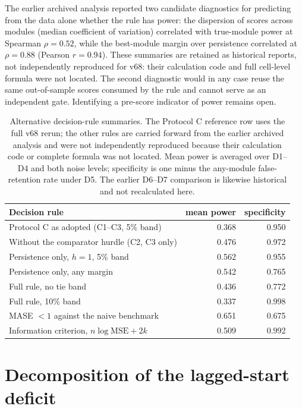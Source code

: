 The earlier archived analysis reported two candidate diagnostics for predicting from the data alone whether the rule has power: the dispersion of scores across modules (median coefficient of variation) correlated with true-module power at Spearman $\rho=0.52$, while the best-module margin over persistence correlated at $\rho=0.88$ (Pearson $r=0.94$). These summaries are retained as historical reports, not independently reproduced for v68: their calculation code and full cell-level formula were not located. The second diagnostic would in any case reuse the same out-of-sample scores consumed by the rule and cannot serve as an independent gate. Identifying a pre-score indicator of power remains open.

\FloatBarrier

\begin{table}[!htb]
\centering\small
\caption{Alternative decision-rule summaries. The Protocol C reference row uses the full v68 rerun; the other rules are carried forward from the earlier archived analysis and were not independently reproduced because their calculation code or complete formula was not located. Mean power is averaged over D1--D4 and both noise levels; specificity is one minus the any-module false-retention rate under D5. The earlier D6--D7 comparison is likewise historical and not recalculated here.}
\label{tab:si_rules}
\begin{tabular}{@{}lrr@{}}
\toprule
Decision rule & mean power & specificity \\
\midrule
Protocol C as adopted (C1--C3, 5\% band) & 0.368 & 0.950 \\
Without the comparator hurdle (C2, C3 only) & 0.476 & 0.972 \\
Persistence only, $h=1$, 5\% band & 0.562 & 0.955 \\
Persistence only, any margin & 0.542 & 0.765 \\
Full rule, no tie band & 0.436 & 0.772 \\
Full rule, 10\% band & 0.337 & 0.998 \\
MASE $<1$ against the naive benchmark & 0.651 & 0.675 \\
Information criterion, $n\log\mathrm{MSE} + 2k$ & 0.509 & 0.992 \\
\bottomrule
\end{tabular}
\end{table}

\section{Decomposition of the lagged-start deficit}\label{si:m4}

